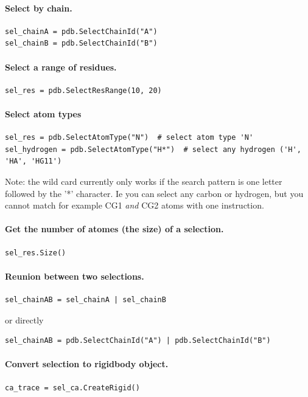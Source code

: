 \documentclass[12pt,a4paper]{article}
\begin{document}
\paragraph{Select by chain.}
\begin{verbatim}
sel_chainA = pdb.SelectChainId("A")
sel_chainB = pdb.SelectChainId("B")
\end{verbatim}


\paragraph{Select a range of residues.}
\begin{verbatim}
sel_res = pdb.SelectResRange(10, 20)
\end{verbatim}

\paragraph{Select atom types}
\begin{verbatim}
sel_res = pdb.SelectAtomType("N")  # select atom type 'N'
sel_hydrogen = pdb.SelectAtomType("H*")  # select any hydrogen ('H', 'HA', 'HG11')
\end{verbatim}

Note: the wild card currently only works if the search pattern is one letter followed by the '*' character. 
Ie you can select any carbon or hydrogen, but you cannot match for example CG1 \emph{and} CG2 atoms with one instruction.


\paragraph{Get the number of atomes (the size) of a selection.}
\begin{verbatim}
sel_res.Size()
\end{verbatim}



\paragraph{Reunion between two selections.}
\begin{verbatim}
sel_chainAB = sel_chainA | sel_chainB
\end{verbatim}
or directly
\begin{verbatim}
sel_chainAB = pdb.SelectChainId("A") | pdb.SelectChainId("B")
\end{verbatim}


\paragraph{Convert selection to rigidbody object.}
\begin{verbatim}
ca_trace = sel_ca.CreateRigid()
\end{verbatim}
\end{document}
